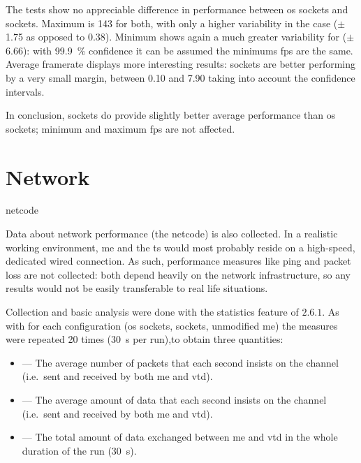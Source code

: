 The tests show no appreciable difference in performance between \gls{os} sockets and  sockets. Maximum is \SI{143}{\fps} for both, with only a higher variability in the  case ($\pm$\SI{1,75}{\fps} as opposed to \SI{0,38}{\fps}). Minimum shows again a much greater variability for  ($\pm$\SI{6,66}{\fps}): with \SI{99,9}{\percent} confidence it can be assumed the minimums \gls{fps} are the same. Average \gls{framerate} displays more interesting results:  sockets are better performing by a very small margin, between \SI{0,10}{\fps} and \SI{7,90}{\fps} taking into account the confidence intervals.

In conclusion,  sockets do provide slightly better average performance than \gls{os} sockets; minimum and maximum \gls{fps} are not affected.

\section{Network}\label{sc:performance:network}

\begin{definition}{netcode}
\end{definition}



Data about network performance (the \gls{netcode}) is also collected. In a realistic working environment, \gls{me} and the \gls{ts} would most probably reside on a high-speed, dedicated wired connection. As such, performance measures like ping and packet loss are not collected: both depend heavily on the network infrastructure, so any results would not be easily transferable to real life situations.

Collection and basic analysis were done with the statistics feature of  $2.6.1$. As with  for each configuration (\gls{os} sockets,  sockets, unmodified \gls{me}) the measures were repeated \num{20} times (\SI{30}{\second} per run),to obtain three quantities:

\begin{itemize}
	\item {} --- The average number of packets that each second insists on the channel (i.e.\ sent and received by both \gls{me} and \gls{vtd}).
	\item {} --- The average amount of data that each second insists on the channel (i.e.\ sent and received by both \gls{me} and \gls{vtd}).
	\item {} --- The total amount of data exchanged between \gls{me} and \gls{vtd} in the whole duration of the run (\SI{30}{\second}).
\end{itemize}

